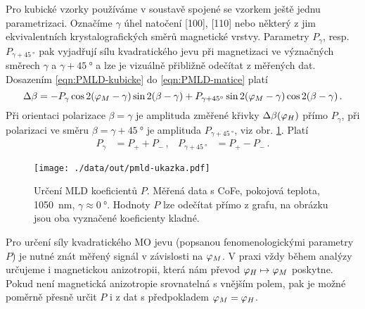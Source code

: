 Pro kubické vzorky používáme v soustavě spojené se vzorkem ještě jednu parametrizaci.
Označíme $\gamma$ úhel natočení [100], [110] nebo některý z jim ekvivalentních krystalografických směrů magnetické vrstvy.
Parametry $P_\gamma$, resp. $P_{\gamma+\SI{45}{\degree}}$ pak vyjadřují sílu kvadratického jevu při magnetizaci ve význačných směrech $\gamma$ a $\gamma+\SI{45}{\degree}$ a lze je vizuálně přibližně odečítat z měřených dat.
Dosazením \eqref{eqn:PMLD-kubicke} do \eqref{eqn:PMLD-matice} platí
\begin{equation}
    \Delta\beta = -P_\gamma \cos 2 (\varphi_M-\gamma) \sin 2(\beta-\gamma) + P_{\gamma+\SI{45}{\degree}} \sin 2 (\varphi_M-\gamma) \cos 2(\beta-\gamma) \,.
\end{equation}
Při orientaci polarizace $\beta=\gamma$ je amplituda změřené křivky $\Delta\beta(\varphi_H)$ přímo $P_{\gamma}$, při polarizaci ve směru $\beta=\gamma+\SI{45}{\degree}$ je amplituda $P_{\gamma+\SI{45}{\degree}}$, viz obr. \ref{fig:urceni-MLD-ilustrace}.
Platí
\begin{align}
    P_{\gamma} &=  P_+ + P_- \,, & P_{\gamma+\SI{45}{\degree}} &= P_+ - P_- \,.
\end{align}

\begin{figure}[htbp]
    \centering
    \texttt{[image: ./data/out/pmld-ukazka.pdf]}
    \caption{Určení MLD koeficientů $P$. Měřená data s CoFe, pokojová teplota, \SI{1050}{\nano\meter}, $\gamma\approx\SI{0}{\degree}$. Hodnoty $P$ lze odečítat přímo z grafu, na obrázku jsou oba vyznačené koeficienty kladné.}
    \label{fig:urceni-MLD-ilustrace}
\end{figure}

Pro určení síly kvadratického MO jevu (popsanou fenomenologickými parametry $P$) je nutné znát měřený signál v závislosti na $\varphi_M$.
V praxi vždy během analýzy určujeme i magnetickou anizotropii, která nám převod $\varphi_H \mapsto \varphi_M$ poskytne.
Pokud není magnetická anizotropie srovnatelná s vnějším polem, pak je možné poměrně přesně určit $P$ i z dat s předpokladem $\varphi_M=\varphi_H$.


